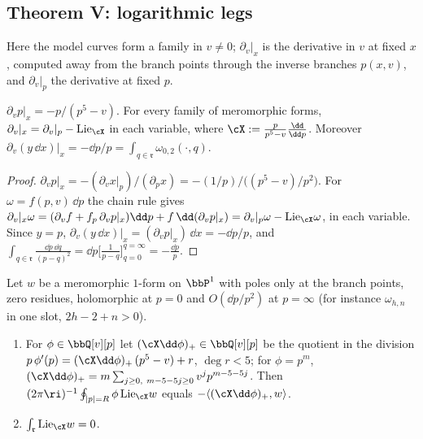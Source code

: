\subsection{Theorem V: logarithmic legs}
\label{sec:mod-V}

Here the model curves form a family in $v\neq 0$; $\partial_v|_x$ is the derivative in $v$ at fixed $x$, computed away from the branch points through the inverse branches $p(x,v)$, and $\partial_v|_p$ the derivative at fixed $p$.

\begin{lem}
\label{lem:mod-fixedx}
$\partial_vp|_x=-p/(p^5-v)$. For every family of meromorphic forms, $\partial_v|_x=\partial_v|_p-\mathrm{Lie}_{\cX}$ in each variable, where $\cX:=\frac{p}{p^5-v}\frac{\dd}{\dd p}$. Moreover $\partial_v(y\,\dd x)|_x=-\dd p/p=\int_{q\in\mathfrak r}\omega_{0,2}(\cdot,q)$.
\end{lem}

\begin{proof}
$\partial_vp|_x=-(\partial_vx|_p)/(\partial_px)=-(1/p)\big/\big((p^5-v)/p^2\big)$. For $\omega=f(p,v)\,\dd p$ the chain rule gives $\partial_v|_x\omega=(\partial_vf+f_p\,\partial_vp|_x)\dd p+f\,\dd(\partial_vp|_x)=\partial_v|_p\omega-\mathrm{Lie}_{\cX}\omega$, in each variable. Since $y=p$, $\partial_v(y\,\dd x)|_x=(\partial_vp|_x)\,\dd x=-\dd p/p$, and $\int_{q\in\mathfrak r}\frac{\dd p\,\dd q}{(p-q)^2}=\dd p\big[\frac{1}{p-q}\big]_{q=0}^{q=\infty}=-\frac{\dd p}{p}$.
\end{proof}

\begin{lem}
\label{lem:mod-ibp}
Let $w$ be a meromorphic $1$-form on $\bbP^1$ with poles only at the branch points, zero residues, holomorphic at $p=0$ and $O(\dd p/p^2)$ at $p=\infty$ (for instance $\omega_{h,n}$ in one slot, $2h-2+n>0$).
\begin{enumerate}
\item For $\phi\in\bbQ[v][p]$ let $(\cX\dd\phi)_+\in\bbQ[v][p]$ be the quotient in the division $p\,\phi'(p)=(\cX\dd\phi)_+\,(p^5-v)+r$, $\deg r<5$; for $\phi=p^m$, $(\cX\dd\phi)_+=m\sum_{j\geq 0,\ m-5-5j\geq 0}v^jp^{m-5-5j}$. Then $(2\pi\ri)^{-1}\oint_{|p|=R}\phi\,\mathrm{Lie}_{\cX}w$ equals $-\langle(\cX\dd\phi)_+,w\rangle$.
\item $\int_{\mathfrak r}\mathrm{Lie}_{\cX}w=0$.
\end{enumerate}
\end{lem}

